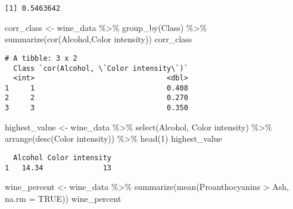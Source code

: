 \documentclass[
  letterpaper,
  DIV=11,
  numbers=noendperiod]{scrartcl}
\newenvironment{Shaded}{\begin{snugshade}}{\end{snugshade}}
\newcommand{\AttributeTok}[1]{\textcolor[rgb]{0.40,0.45,0.13}{#1}}
\newcommand{\ConstantTok}[1]{\textcolor[rgb]{0.56,0.35,0.01}{#1}}
\newcommand{\DecValTok}[1]{\textcolor[rgb]{0.68,0.00,0.00}{#1}}
\newcommand{\FunctionTok}[1]{\textcolor[rgb]{0.28,0.35,0.67}{#1}}
\newcommand{\NormalTok}[1]{\textcolor[rgb]{0.00,0.23,0.31}{#1}}
\newcommand{\OtherTok}[1]{\textcolor[rgb]{0.00,0.23,0.31}{#1}}
\newcommand{\SpecialCharTok}[1]{\textcolor[rgb]{0.37,0.37,0.37}{#1}}
\newcommand{\StringTok}[1]{\textcolor[rgb]{0.13,0.47,0.30}{#1}}
\begin{document}
\begin{verbatim}
[1] 0.5463642
\end{verbatim}

\begin{Shaded}
\begin{Highlighting}[]
\NormalTok{corr\_class }\OtherTok{\textless{}{-}}\NormalTok{ wine\_data }\SpecialCharTok{\%\textgreater{}\%} 
                  \FunctionTok{group\_by}\NormalTok{(Class) }\SpecialCharTok{\%\textgreater{}\%} 
                  \FunctionTok{summarize}\NormalTok{(}\FunctionTok{cor}\NormalTok{(Alcohol,}\StringTok{\textasciigrave{}}\AttributeTok{Color intensity}\StringTok{\textasciigrave{}}\NormalTok{))}
\NormalTok{corr\_class}
\end{Highlighting}
\end{Shaded}

\begin{verbatim}
# A tibble: 3 x 2
  Class `cor(Alcohol, \`Color intensity\`)`
  <int>                               <dbl>
1     1                               0.408
2     2                               0.270
3     3                               0.350
\end{verbatim}

\begin{Shaded}
\begin{Highlighting}[]
\NormalTok{highest\_value }\OtherTok{\textless{}{-}}\NormalTok{ wine\_data }\SpecialCharTok{\%\textgreater{}\%} 
                 \FunctionTok{select}\NormalTok{(Alcohol, }\StringTok{\textasciigrave{}}\AttributeTok{Color intensity}\StringTok{\textasciigrave{}}\NormalTok{) }\SpecialCharTok{\%\textgreater{}\%} 
                 \FunctionTok{arrange}\NormalTok{(}\FunctionTok{desc}\NormalTok{(}\StringTok{\textasciigrave{}}\AttributeTok{Color intensity}\StringTok{\textasciigrave{}}\NormalTok{)) }\SpecialCharTok{\%\textgreater{}\%} \FunctionTok{head}\NormalTok{(}\DecValTok{1}\NormalTok{)}
\NormalTok{highest\_value}
\end{Highlighting}
\end{Shaded}

\begin{verbatim}
  Alcohol Color intensity
1   14.34              13
\end{verbatim}

\begin{Shaded}
\begin{Highlighting}[]
\NormalTok{wine\_percent }\OtherTok{\textless{}{-}}\NormalTok{ wine\_data }\SpecialCharTok{\%\textgreater{}\%} \FunctionTok{summarize}\NormalTok{(}\FunctionTok{mean}\NormalTok{(Proanthocyanins }\SpecialCharTok{\textgreater{}}\NormalTok{ Ash, }\AttributeTok{na.rm =} \ConstantTok{TRUE}\NormalTok{))}
\NormalTok{wine\_percent}
\end{Highlighting}
\end{Shaded}
\end{document}
